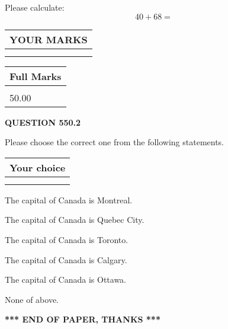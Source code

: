 \documentclass[12pt]{article}
\begin{document}
  
 
Please calculate:
\begin{equation}
40 +  %
68 = \nonumber
\end{equation}
 

 

 
  
\vspace{0.2in}
  
\noindent\begin{tabular}{|l|}
\hline
 YOUR MARKS  \\
\hline
 \\ 
 \\ 
\hline
\end{tabular}
\hspace{0.05in} \begin{tabular}{|l|}
\hline
 Full Marks  \\
\hline
 \\ 
50.00 \\
\hline
\end{tabular}
{\textbf{\Large{QUESTION
550.2 
}}}
  
  
Please choose the correct one from the following statements.
  
  
\noindent\hspace{3.0in} \begin{tabular}{|l|}
\hline
Your choice \\
\hline
 \\ 
 \\ 
\hline
\end{tabular}
  
  
 
 
The capital of Canada is Montreal.
 
 
The capital of Canada is Quebec City.
 
 
The capital of Canada is Toronto.
 
 
The capital of Canada is Calgary.
 
 
The capital of Canada is Ottawa.
 
 
 None of above.
 
 
   
   
 \vspace{0.2in}
 
   
   
   
   
\vspace{1.0in} 
{\textbf{\large{ *** END OF PAPER, THANKS *** }}} 
   
\end{document}
